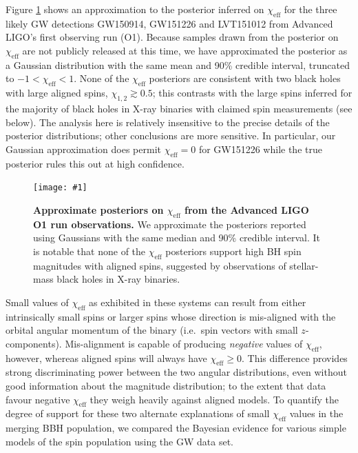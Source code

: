 \documentclass{nature}
\newcommand{\chieff}{\chi_\mathrm{eff}}
\newcommand{\plotone}[1]{\texttt{[image: \#1]}}
\begin{document}
Figure \ref{fig:O1-posteriors} shows an approximation to the posterior
inferred on $\chieff$ for the three likely \ac{GW} detections
GW150914, GW151226 and LVT151012 from Advanced LIGO's first observing
run (O1)\cite{O1-BBH}.  Because samples drawn from the posterior on
$\chieff$ are not publicly released at this time, we have approximated
the posterior as a Gaussian distribution with the same mean and 90\%
credible interval, truncated to $-1 < \chieff < 1$.  None of the
$\chieff$ posteriors are consistent with two black holes with large
aligned spins, $\chi_{1,2} \gtrsim 0.5$; this contrasts with the large
spins inferred for the majority of black holes in X-ray binaries with
claimed spin measurements (see below).  The analysis here is
relatively insensitive to the precise details of the posterior
distributions; other conclusions are more sensitive.  In particular,
our Gaussian approximation does permit $\chieff = 0$ for GW151226
while the true posterior rules this out at high
confidence\cite{2016PhRvL.116x1103A,O1-BBH}.

\begin{figure}
  \plotone{../plots/chi-eff-mock-posteriors}
  \caption{\label{fig:O1-posteriors} \textbf{Approximate posteriors on
      $\chieff$ from the Advanced LIGO O1 run
      observations\cite{O1-BBH}.}  We approximate the posteriors
    reported using Gaussians with the same median and 90\% credible
    interval.  It is notable that none of the $\chieff$ posteriors
    support high \ac{BH} spin magnitudes with aligned spins, suggested
    by observations of stellar-mass black holes in X-ray
    binaries\cite{2015PhR...548....1M}.}
\end{figure}

Small values of $\chieff$ as exhibited in these systems can result
from either intrinsically small spins or larger spins whose direction
is mis-aligned with the orbital angular momentum of the binary (i.e.\
spin vectors with small $z$-components).  Mis-alignment is capable of
producing \emph{negative} values of $\chieff$, however, whereas
aligned spins will always have $\chieff \geq 0$.  This difference
provides strong discriminating power between the two angular
distributions, even without good information about the magnitude
distribution; to the extent that data favour negative $\chieff$ they
weigh heavily against aligned models.  To quantify the degree of
support for these two alternate explanations of small $\chieff$ values
in the merging \ac{BBH} population, we compared the Bayesian evidence
for various simple models of the spin population using the \ac{GW}
data set.
\end{document}
